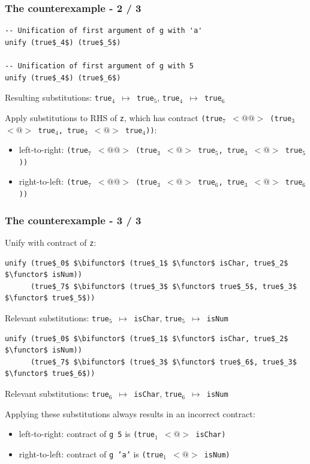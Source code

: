 \documentclass[]{beamer}
\makeatletter
\newcommand{\functor}{<\!\!\!@\!\!\!>}
\newcommand{\bifunctor}{<\!\!\!@\!\!@\!\!\!>}
\makeatother
\begin{document}
\begin{frame}[fragile]
\frametitle{The counterexample - 2 / 3}

\begin{lstlisting}[mathescape]
-- Unification of first argument of g with 'a'
unify (true$_4$) (true$_5$)

-- Unification of first argument of g with 5
unify (true$_4$) (true$_6$)
\end{lstlisting}

Resulting substitutions: \texttt{true$_4$ $\mapsto$ true$_5$}, \texttt{true$_4$ $\mapsto$ true$_6$}

Apply substitutions to RHS of \texttt{z}, which has contract \texttt{(true$_7$ $\bifunctor$ (true$_3$ $\functor$ true$_4$, true$_3$ $\functor$ true$_4$))}:

\begin{itemize}
	\item left-to-right: \texttt{(true$_7$ $\bifunctor$ (true$_3$ $\functor$ true\emph{$_5$}, true$_3$ $\functor$ true\emph{$_5$}))}
	\item right-to-left: \texttt{(true$_7$ $\bifunctor$ (true$_3$ $\functor$ true\emph{$_6$}, true$_3$ $\functor$ true\emph{$_6$}))}
\end{itemize}

\end{frame}

\begin{frame}[fragile]
\frametitle{The counterexample - 3 / 3}

Unify with contract of \texttt{z}:

\begin{lstlisting}[mathescape]
unify (true$_0$ $\bifunctor$ (true$_1$ $\functor$ isChar, true$_2$ $\functor$ isNum))
      (true$_7$ $\bifunctor$ (true$_3$ $\functor$ true$_5$, true$_3$ $\functor$ true$_5$))
\end{lstlisting}

Relevant substitutions: \texttt{true$_5$ $\mapsto$ isChar}, \texttt{true$_5$ $\mapsto$ isNum}

\begin{lstlisting}[mathescape]
unify (true$_0$ $\bifunctor$ (true$_1$ $\functor$ isChar, true$_2$ $\functor$ isNum))
      (true$_7$ $\bifunctor$ (true$_3$ $\functor$ true$_6$, true$_3$ $\functor$ true$_6$))
\end{lstlisting}

Relevant substitutions: \texttt{true$_6$ $\mapsto$ isChar}, \texttt{true$_6$ $\mapsto$ isNum}

Applying these substitutions always results in an incorrect contract:
\begin{itemize}
\item left-to-right: contract of \texttt{g 5} is \texttt{(true$_1$ $\functor$ isChar)}
\item right-to-left: contract of \texttt{g 'a'} is \texttt{(true$_1$ $\functor$ isNum)}
\end{itemize}

\end{frame}
\end{document}
